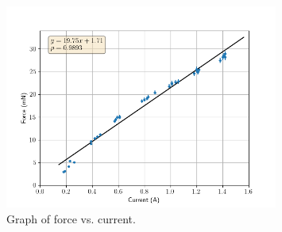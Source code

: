 \begin{figure}[b!]
	\centering
	\includegraphics[width=0.8\textwidth]{figures/procplot.png}
	\caption{Graph of force vs. current.}
	\label{fig:procplot}
\end{figure}

\newpage
